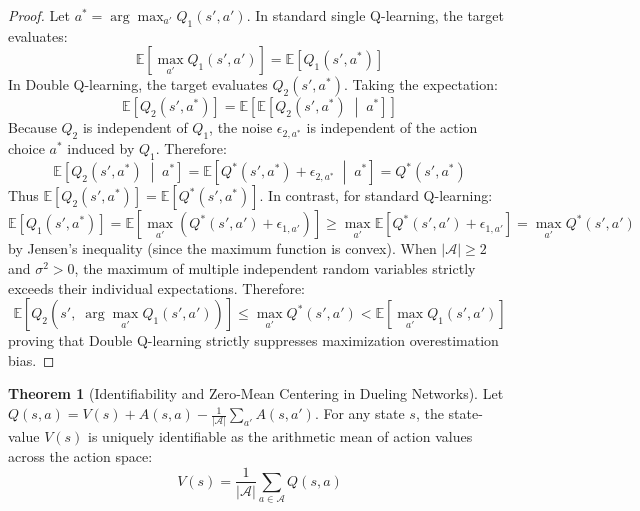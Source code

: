 \documentclass[11pt,a4paper]{article}
\theoremstyle{definition}
\newtheorem{theorem}{\textbf{Theorem}}[section]
\begin{document}
\begin{proof}
Let $a^* = \arg\max_{a'} Q_1(s', a')$.
In standard single Q-learning, the target evaluates:
{\boldmath
\begin{equation}
\mathbb{E}\left[ \max_{a'} Q_1(s', a') \right] = \mathbb{E}\left[ Q_1(s', a^*) \right]
\end{equation}
}
In Double Q-learning, the target evaluates $Q_2(s', a^*)$.
Taking the expectation:
{\boldmath
\begin{equation}
\mathbb{E}\left[ Q_2(s', a^*) \right] = \mathbb{E}\left[ \mathbb{E}\left[ Q_2(s', a^*) \;\middle|\; a^* \right] \right]
\end{equation}
}
Because $Q_2$ is independent of $Q_1$, the noise $\epsilon_{2, a^*}$ is independent of the action choice $a^*$ induced by $Q_1$.
Therefore:
{\boldmath
\begin{equation}
\mathbb{E}\left[ Q_2(s', a^*) \;\middle|\; a^* \right] = \mathbb{E}\left[ Q^*(s', a^*) + \epsilon_{2, a^*} \;\middle|\; a^* \right] = Q^*(s', a^*)
\end{equation}
}
Thus $\mathbb{E}[Q_2(s', a^*)] = \mathbb{E}[Q^*(s', a^*)]$.
In contrast, for standard Q-learning:
{\boldmath
\begin{equation}
\mathbb{E}\left[ Q_1(s', a^*) \right] = \mathbb{E}\left[ \max_{a'} \left( Q^*(s', a') + \epsilon_{1, a'} \right) \right] \ge \max_{a'} \mathbb{E}\left[ Q^*(s', a') + \epsilon_{1, a'} \right] = \max_{a'} Q^*(s', a')
\end{equation}
}
by Jensen's inequality (since the maximum function is convex).
When $|\mathcal{A}| \ge 2$ and $\sigma^2 > 0$, the maximum of multiple independent random variables strictly exceeds their individual expectations.
Therefore:
{\boldmath
\begin{equation}
\mathbb{E}\left[ Q_2\left( s', \; \arg\max_{a'} Q_1(s', a') \right) \right] \le \max_{a'} Q^*(s', a') < \mathbb{E}\left[ \max_{a'} Q_1(s', a') \right]
\end{equation}
}
proving that Double Q-learning strictly suppresses maximization overestimation bias.
\end{proof}

\begin{theorem}[Identifiability and Zero-Mean Centering in Dueling Networks]
Let $Q(s, a) = V(s) + A(s, a) - \frac{1}{|\mathcal{A}|}\sum_{a'} A(s, a')$. For any state $s$, the state-value $V(s)$ is uniquely identifiable as the arithmetic mean of action values across the action space:
{\boldmath
\begin{equation}
V(s) = \frac{1}{|\mathcal{A}|} \sum_{a \in \mathcal{A}} Q(s, a)
\end{equation}
}
\end{theorem}
\end{document}
